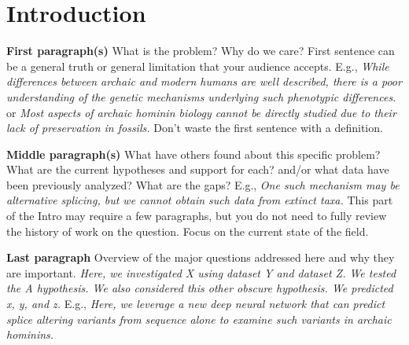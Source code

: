 \section{Introduction}
\introTips %

\noindent\textbf{First paragraph(s)} What is the problem? Why do we care?  First sentence can be a general truth or general limitation that your audience accepts. E.g., \textit{While differences between archaic and modern humans are well described, there is a poor understanding of the genetic mechanisms underlying such phenotypic differences.} or  \textit{Most aspects of archaic hominin biology cannot be directly studied due to their lack of preservation in fossils.} Don't waste the first sentence with a definition.

\textbf{Middle paragraph(s)} What have others found about this specific problem? What are the current hypotheses and support for each? and/or what data have been previously analyzed? What are the gaps? E.g., \textit{One such mechanism may be alternative splicing, but we cannot obtain such data from extinct taxa.} This part of the Intro may require a few paragraphs, but you do not need to fully review the history of work on the question. Focus on the current state of the field.

\textbf{Last paragraph} Overview of the major questions addressed here and why they are important. \textit{Here, we investigated X using dataset Y and dataset Z. We tested the A hypothesis. We also considered this other obscure hypothesis. We predicted x, y, and z.} E.g., \textit{Here, we leverage a new deep neural network that can predict splice altering variants from sequence alone to examine such variants in archaic hominins.}
